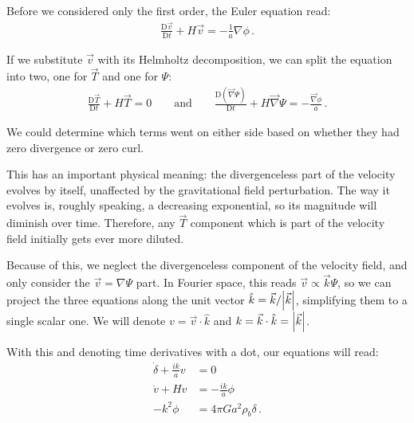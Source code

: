 \documentclass[main.tex]{subfiles}
\begin{document}
Before we considered only the first order, the Euler equation read:
%
\begin{align}
  \frac{\mathrm{D} \vec{v}}{\mathrm{D}t}  
  + H \vec{v} = - \frac{1}{a} \nabla \phi 
\,.
\end{align}

If we substitute \(\vec{v}\) with its Helmholtz decomposition, we can split the equation into two, one for \(\vec{T}\) and one for \(\Psi \):
%
\begin{align}
  \frac{\mathrm{D} \vec{T}}{\mathrm{D}t} + H \vec{T} = 0
  \qquad \text{and} \qquad
  \frac{\mathrm{D} (\vec{\nabla} \Psi )}{\mathrm{D}t} + H \vec{\nabla} \Psi = - \frac{\vec{\nabla} \phi}{a}
\,.
\end{align}

We could determine which terms went on either side based on whether they had zero divergence or zero curl.


This has an important physical meaning: the divergenceless part of the velocity evolves by itself, unaffected by the gravitational field perturbation. The way it evolves is, roughly speaking, a decreasing exponential, so its magnitude will diminish over time. 
Therefore, any \(\vec{T}\) component which is part of the velocity field initially gets ever more diluted.

Because of this, we neglect the divergenceless component of the velocity field, and only consider the \(\vec{v} = \nabla \Psi \) part. 
In Fourier space, this reads \(\vec{v} \propto \vec{k} \Psi \), so we can project the three equations along the unit vector \(\hat{k} = \vec{k} / \abs{\vec{k}}\), simplifying them to a single scalar one.
We will denote \(v = \vec{v} \cdot \hat{k}\) and \(k= \vec{k} \cdot \hat{k} = \abs{\vec{k}}\).

With this and denoting time derivatives with a dot, our equations will read:
%
\begin{align}
  \dot{\delta} + \frac{ik}{a} v &= 0 \\
  \dot{v} + H v &= - \frac{ik}{a} \phi \\
  - k^2 \phi &= 4 \pi G a^2 \rho_b \delta
\,.
\end{align}
\end{document}
